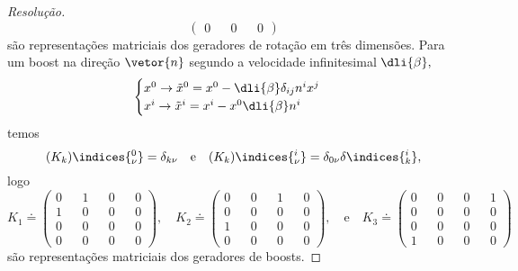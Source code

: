 \begin{proof}[Resolução]
\begin{equation*}
\begin{pmatrix}
            0 && 0 && 0
        \end{pmatrix}
    \end{equation*}
    são representações matriciais dos geradores de rotação em três dimensões. Para um boost na direção \(\vetor{n}\) segundo a velocidade infinitesimal \(\dli{\beta},\)
    \begin{equation*}
        \begin{cases}
            x^0 \to \tilde{x}^0 = x^0 - \dli{\beta} \delta_{ij} n^i x^j\\
            x^i \to \tilde{x}^i = x^i - x^0 \dli{\beta} n^i
        \end{cases}
    \end{equation*}
    temos
    \begin{equation*}
        (K_k)\indices{^0_\nu} = \delta_{k\nu}\quad\text{e}\quad
        (K_k)\indices{^i_\nu} = \delta_{0\nu} \delta\indices{^i_k},
    \end{equation*}
    logo
    \begin{equation*}
        K_1 \doteq \begin{pmatrix}
            0 && 1 && 0 && 0\\
            1 && 0 && 0 && 0\\
            0 && 0 && 0 && 0\\
            0 && 0 && 0 && 0
        \end{pmatrix},
        \quad
        K_2 \doteq \begin{pmatrix}
            0 && 0 && 1 && 0\\
            0 && 0 && 0 && 0\\
            1 && 0 && 0 && 0\\
            0 && 0 && 0 && 0
        \end{pmatrix},
        \quad\text{e}\quad
        K_3 \doteq \begin{pmatrix}
            0 && 0 && 0 && 1\\
            0 && 0 && 0 && 0\\
            0 && 0 && 0 && 0\\
            1 && 0 && 0 && 0
        \end{pmatrix}
    \end{equation*}
    são representações matriciais dos geradores de boosts.
\end{proof}
